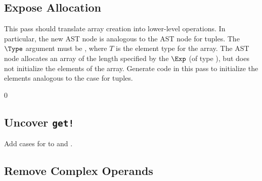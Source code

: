 \documentclass[7x10]{TimesAPriori_MIT}%
\def\racketEd{0}
\def\edition{1}
\numberwithin{theorem}{chapter}
\numberwithin{definition}{chapter}
\numberwithin{equation}{chapter}
\begin{document}


\subsection{Expose Allocation}


This pass should translate array creation into lower-level
operations. In particular, the new AST node \ALLOCARRAY{\Int}{\Type}
is analogous to the  AST node for tuples.  The $\Type$
argument must be , where $T$ is the element type for the
array. The  AST node allocates an array of the
length specified by the $\Exp$ (of type \INTTY), but does not
initialize the elements of the array. Generate code in this pass to
initialize the elements analogous to the case for tuples.


{\if\edition\racketEd
\subsection{Uncover \texttt{get!}}
\label{sec:uncover-get-bang-vecof}

Add cases for  to  and
.

\fi}

\subsection{Remove Complex Operands}
\end{document}
